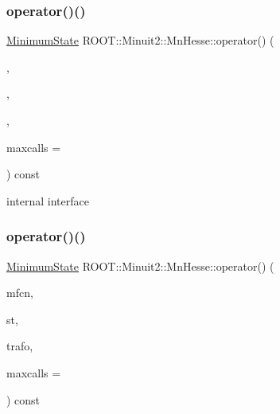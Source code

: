 \subsubsection{\texorpdfstring{operator()()}{operator()()}\hspace{0.1cm}{\footnotesize\ttfamily [22/24]}}
{\footnotesize\ttfamily \mbox{\hyperlink{classROOT_1_1Minuit2_1_1MinimumState}{Minimum\+State}} R\+O\+O\+T\+::\+Minuit2\+::\+Mn\+Hesse\+::operator() (\begin{DoxyParamCaption}\item[{const \mbox{\hyperlink{classROOT_1_1Minuit2_1_1MnFcn}{Mn\+Fcn}} \&}]{,  }\item[{const \mbox{\hyperlink{classROOT_1_1Minuit2_1_1MinimumState}{Minimum\+State}} \&}]{,  }\item[{const \mbox{\hyperlink{classROOT_1_1Minuit2_1_1MnUserTransformation}{Mn\+User\+Transformation}} \&}]{,  }\item[{unsigned int}]{maxcalls = {} }\end{DoxyParamCaption}) const}

internal interface \mbox{\label{classROOT_1_1Minuit2_1_1MnHesse_a4130de0190695811a4606f8ab229482d}} 
\subsubsection{\texorpdfstring{operator()()}{operator()()}\hspace{0.1cm}{\footnotesize\ttfamily [23/24]}}
{\footnotesize\ttfamily \mbox{\hyperlink{classROOT_1_1Minuit2_1_1MinimumState}{Minimum\+State}} R\+O\+O\+T\+::\+Minuit2\+::\+Mn\+Hesse\+::operator() (\begin{DoxyParamCaption}\item[{const \mbox{\hyperlink{classROOT_1_1Minuit2_1_1MnFcn}{Mn\+Fcn}} \&}]{mfcn,  }\item[{const \mbox{\hyperlink{classROOT_1_1Minuit2_1_1MinimumState}{Minimum\+State}} \&}]{st,  }\item[{const \mbox{\hyperlink{classROOT_1_1Minuit2_1_1MnUserTransformation}{Mn\+User\+Transformation}} \&}]{trafo,  }\item[{unsigned int}]{maxcalls = {} }\end{DoxyParamCaption}) const}

